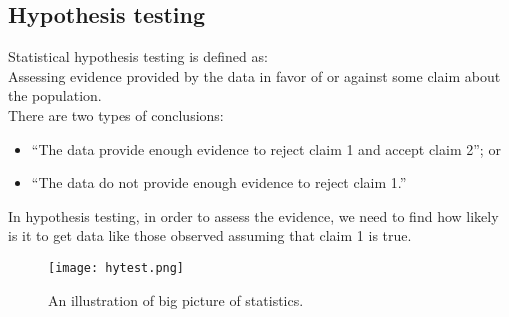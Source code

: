 \documentclass[10pt, a4paper]{article}
\begin{document}
\subsection{Hypothesis testing}
Statistical hypothesis testing is defined as:\\
Assessing evidence provided by the data in favor of or against some claim about the population.\\
There are two types of conclusions:
\begin{itemize}
\item ``The data provide enough evidence to reject claim 1 and accept claim 2''; or
\item ``The data do not provide enough evidence to reject claim 1.''
\end{itemize}
In hypothesis testing, in order to assess the evidence, we need to find how likely is it to get data like those observed assuming that claim 1 is true.\par
\begin{figure}
[h!]
\centering
\texttt{[image: hytest.png]}
\caption{An illustration of big picture of statistics.}
\end{figure}
\end{document}
